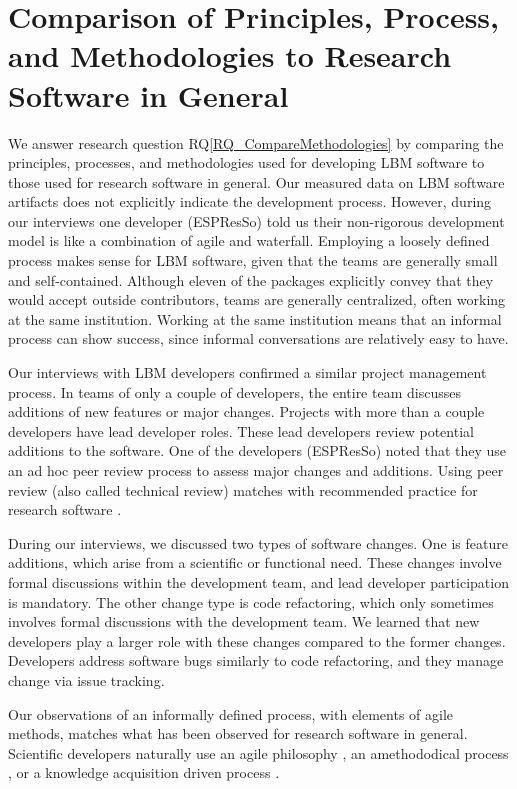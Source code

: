 \documentclass[final, 3p, times, authoryear]{elsarticle}
\newcommand{\rqref}[1]{RQ\ref{#1}}
\begin{document}
\section{Comparison of Principles, Process, and Methodologies to Research Software in General} \label{Sec_CompareMethodologies}

We answer research question \rqref{RQ_CompareMethodologies} by comparing the
principles, processes, and methodologies used for developing LBM software to
those used for research software in general. Our measured data on LBM software
artifacts does not explicitly indicate the development process. However, during
our interviews one developer (ESPResSo) told us their non-rigorous development
model is like a combination of agile and waterfall. Employing a loosely defined
process makes sense for LBM software, given that the teams are generally small
and self-contained.  Although eleven of the packages explicitly convey that they
would accept outside contributors, teams are generally centralized, often
working at the same institution. Working at the same institution means that an
informal process can show success, since informal conversations are relatively
easy to have.

Our interviews with LBM developers confirmed a similar project management
process. In teams of only a couple of developers, the entire team discusses
additions of new features or major changes. Projects with more than a couple
developers have lead developer roles. These lead developers review potential
additions to the software. One of the developers (ESPResSo) noted that they use
an ad hoc peer review process to assess major changes and additions. Using peer
review (also called technical review) matches with recommended practice for
research software \citep{HerouxEtAl2008, Givler2020, OrvizEtAl2017, USGS2019}.

During our interviews, we discussed two types of software changes. One is
feature additions, which arise from a scientific or functional need. These
changes involve formal discussions within the development team, and lead
developer participation is mandatory. The other change type is code refactoring,
which only sometimes involves formal discussions with the development team. We
learned that new developers play a larger role with these changes compared to
the former changes. Developers address software bugs similarly to code
refactoring, and they manage change via issue tracking.

Our observations of an informally defined process, with elements of agile
methods, matches what has been observed for research software in general.
Scientific developers naturally use an agile philosophy \citep{AckroydEtAl2008,
CarverEtAl2007, EasterbrookAndJohns2009, Segal2005, HeatonAndCarver2015}, an
amethododical process \citep{Kelly2013}, or a knowledge acquisition driven
process \citep{Kelly2015}.
\end{document}
